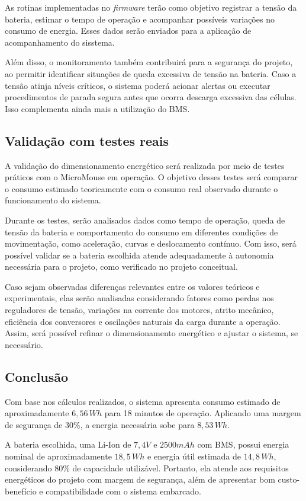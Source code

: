 As rotinas implementadas no \textit{firmware} terão como objetivo registrar a tensão da bateria, estimar o tempo de operação e acompanhar possíveis variações no consumo de energia. Esses dados serão enviados para a aplicação de acompanhamento do sisstema. 

Além disso, o monitoramento também contribuirá para a segurança do projeto, ao permitir identificar situações de queda excessiva de tensão na bateria. Caso a tensão atinja níveis críticos, o sistema poderá acionar alertas ou executar procedimentos de parada segura antes que ocorra descarga excessiva das células. Isso complementa ainda mais a utilização do BMS.

\subsection{Validação com testes reais}

A validação do dimensionamento energético será realizada por meio de testes práticos com o MicroMouse em operação. O objetivo desses testes será comparar o consumo estimado teoricamente com o consumo real observado durante o funcionamento do sistema.

Durante os testes, serão analisados dados como tempo de operação, queda de tensão da bateria e comportamento do consumo em diferentes condições de movimentação, como aceleração, curvas e deslocamento contínuo. Com isso, será possível validar se a bateria escolhida atende adequadamente à autonomia necessária para o projeto, como verificado no projeto conceitual.

Caso sejam observadas diferenças relevantes entre os valores teóricos e experimentais, elas serão analisadas considerando fatores como perdas nos reguladores de tensão, variações na corrente dos motores, atrito mecânico, eficiência dos conversores e oscilações naturais da carga durante a operação. Assim, será possível refinar o dimensionamento energético e ajustar o sistema, se necessário.

\subsection{Conclusão}

Com base nos cálculos realizados, o sistema apresenta consumo estimado de aproximadamente $6{,}56\,Wh$ para 18 minutos de operação. Aplicando uma margem de segurança de 30\%, a energia necessária sobe para $8{,}53\,Wh$.

A bateria escolhida, uma Li-Ion de $7,4V$ e $2500mAh$ com BMS, possui energia nominal de aproximadamente $18,5\,Wh$ e energia útil estimada de $14,8\,Wh$, considerando 80\% de capacidade utilizável. Portanto, ela atende aos requisitos energéticos do projeto com margem de segurança, além de apresentar bom custo-benefício e compatibilidade com o sistema embarcado.

